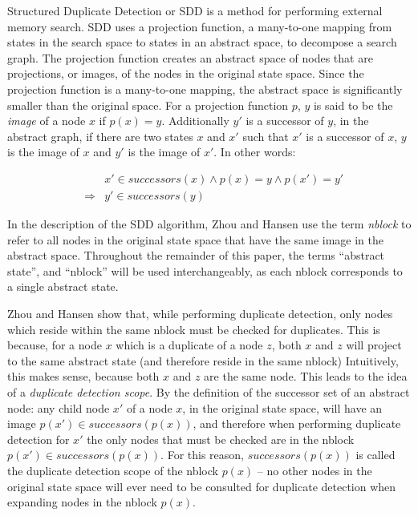\documentclass{article} \usepackage{aaai} \usepackage{graphicx}
\begin{document}
Structured Duplicate Detection or SDD \cite{zhou:sdd} is a method for
performing external memory search.  SDD uses a projection function, a
many-to-one mapping from states in the search space to states in an
abstract space, to decompose a search graph.  The projection function
creates an abstract space of nodes that are projections, or images, of
the nodes in the original state space.  Since the projection function
is a many-to-one mapping, the abstract space is significantly smaller
than the original space.  For a projection function $p$, $y$ is said
to be the \emph{image} of a node $x$ if $p(x) = y$.  Additionally $y'$
is a successor of $y$, in the abstract graph, if there are two states
$x$ and $x'$ such that $x'$ is a successor of $x$, $y$ is the image of
$x$ and $y'$ is the image of $x'$.  In other words:

\begin{eqnarray*}
&&x' \in successors(x) \wedge p(x) = y \wedge p(x') = y' \\
&\Rightarrow& y' \in successors(y)
\end{eqnarray*}

In the description of the SDD algorithm, Zhou and Hansen use the term
\emph{nblock} to refer to all nodes in the original state space that
have the same image in the abstract space.  Throughout the remainder
of this paper, the terms ``abstract state'', and ``nblock'' will be
used interchangeably, as each nblock corresponds to a single abstract
state.

Zhou and Hansen show that, while performing duplicate detection, only
nodes which reside within the same nblock must be checked for
duplicates.  This is because, for a node $x$ which is a duplicate of a
node $z$, both $x$ and $z$ will project to the same abstract state
(and therefore reside in the same nblock) Intuitively, this makes
sense, because both $x$ and $z$ are the same node.  This leads to the
idea of a \emph{duplicate detection scope}.  By the definition of the
successor set of an abstract node: any child node $x'$ of a node $x$,
in the original state space, will have an image $p(x') \in
successors(p(x))$, and therefore when performing duplicate detection
for $x'$ the only nodes that must be checked are in the nblock $p(x')
\in successors(p(x))$.  For this reason, $successors(p(x))$ is called
the duplicate detection scope of the nblock $p(x)$ -- no other nodes
in the original state space will ever need to be consulted for
duplicate detection when expanding nodes in the nblock $p(x)$.
\end{document}
